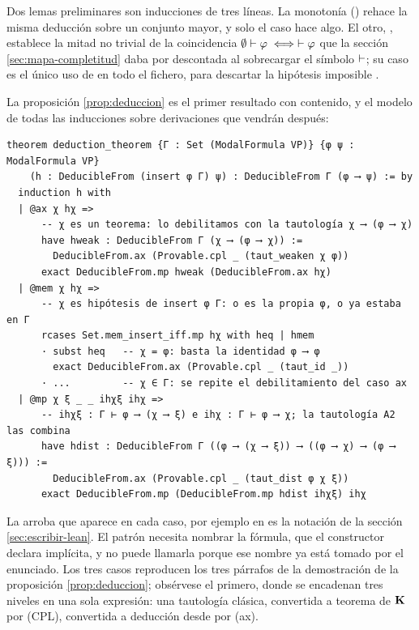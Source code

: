 Dos lemas preliminares son inducciones de tres líneas. La monotonía () rehace la misma deducción sobre un conjunto mayor, y solo el caso  hace algo. El otro, , establece la mitad no trivial de la coincidencia $\emptyset \vdash \varphi \iff \vdash \varphi$ que la sección \ref{sec:mapa-completitud} daba por descontada al sobrecargar el símbolo $\vdash$; su caso  es el único uso de  en todo el fichero, para descartar la hipótesis imposible .

La proposición \ref{prop:deduccion} es el primer resultado con contenido, y el modelo de todas las inducciones sobre derivaciones que vendrán después:

\begin{lstlisting}
theorem deduction_theorem {Γ : Set (ModalFormula VP)} {φ ψ : ModalFormula VP}
    (h : DeducibleFrom (insert φ Γ) ψ) : DeducibleFrom Γ (φ ⟶ ψ) := by
  induction h with
  | @ax χ hχ =>
      -- χ es un teorema: lo debilitamos con la tautología χ ⟶ (φ ⟶ χ)
      have hweak : DeducibleFrom Γ (χ ⟶ (φ ⟶ χ)) :=
        DeducibleFrom.ax (Provable.cpl _ (taut_weaken χ φ))
      exact DeducibleFrom.mp hweak (DeducibleFrom.ax hχ)
  | @mem χ hχ =>
      -- χ es hipótesis de insert φ Γ: o es la propia φ, o ya estaba en Γ
      rcases Set.mem_insert_iff.mp hχ with heq | hmem
      · subst heq   -- χ = φ: basta la identidad φ ⟶ φ
        exact DeducibleFrom.ax (Provable.cpl _ (taut_id _))
      · ...         -- χ ∈ Γ: se repite el debilitamiento del caso ax
  | @mp χ ξ _ _ ihχξ ihχ =>
      -- ihχξ : Γ ⊢ φ ⟶ (χ ⟶ ξ) e ihχ : Γ ⊢ φ ⟶ χ; la tautología A2 las combina
      have hdist : DeducibleFrom Γ ((φ ⟶ (χ ⟶ ξ)) ⟶ ((φ ⟶ χ) ⟶ (φ ⟶ ξ))) :=
        DeducibleFrom.ax (Provable.cpl _ (taut_dist φ χ ξ))
      exact DeducibleFrom.mp (DeducibleFrom.mp hdist ihχξ) ihχ
\end{lstlisting}

La arroba que aparece en cada caso, por ejemplo en  es la notación de la sección \ref{sec:escribir-lean}. El patrón necesita nombrar la fórmula, que el constructor declara implícita, y no puede llamarla  porque ese nombre ya está tomado por el enunciado. Los tres casos reproducen los tres párrafos de la demostración de la proposición \ref{prop:deduccion}; obsérvese el primero, donde se encadenan tres niveles en una sola expresión: una tautología clásica, convertida a teorema de $\mathbf{K}$ por (CPL), convertida a deducción desde  por (ax).

